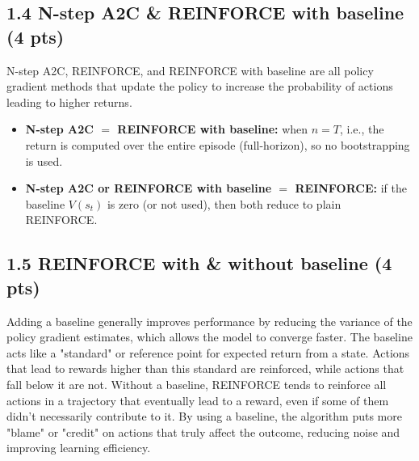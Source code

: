 \documentclass[12pt]{article}
\begin{document}
\subsection*{1.4 N-step A2C \& REINFORCE with baseline (4 pts)}
\begin{solution}[height=5cm]
N-step A2C, REINFORCE, and REINFORCE with baseline are all policy gradient methods that update the policy to increase the probability of actions leading to higher returns. 
\begin{itemize}
    \item \textbf{N-step A2C $=$ REINFORCE with baseline:} when $n=T$, i.e., the return is computed over the entire episode (full-horizon), so no bootstrapping is used.
    \item \textbf{N-step A2C or REINFORCE with baseline $=$ REINFORCE:} if the baseline $V(s_t)$ is zero (or not used), then both reduce to plain REINFORCE.
\end{itemize}

\end{solution}

\subsection*{1.5 REINFORCE with \& without baseline (4 pts)}
\begin{solution}[height=5cm]
Adding a baseline generally improves performance by reducing the variance of the policy gradient estimates, 
which allows the model to converge faster. 
The baseline acts like a "standard" or reference point for expected return from a state. 
Actions that lead to rewards higher than this standard are reinforced, 
while actions that fall below it are not. 
Without a baseline, REINFORCE tends to reinforce all actions in a trajectory that eventually lead to a reward, 
even if some of them didn't necessarily contribute to it. 
By using a baseline, the algorithm puts more "blame" or "credit" on actions that truly affect the outcome, 
reducing noise and improving learning efficiency.

\end{solution}
\end{document}
